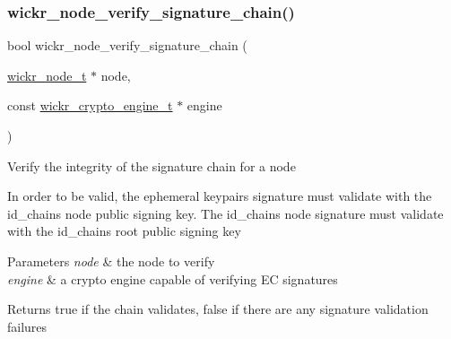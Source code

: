\subsubsection{\texorpdfstring{wickr\+\_\+node\+\_\+verify\+\_\+signature\+\_\+chain()}{wickr\_node\_verify\_signature\_chain()}}
{\footnotesize\ttfamily bool wickr\+\_\+node\+\_\+verify\+\_\+signature\+\_\+chain (\begin{DoxyParamCaption}\item[{\hyperlink{structwickr__node}{wickr\+\_\+node\+\_\+t} $\ast$}]{node,  }\item[{const \hyperlink{structwickr__crypto__engine}{wickr\+\_\+crypto\+\_\+engine\+\_\+t} $\ast$}]{engine }\end{DoxyParamCaption})}

Verify the integrity of the signature chain for a node

In order to be valid, the ephemeral keypair\textquotesingle{}s signature must validate with the id\+\_\+chain\textquotesingle{}s \textquotesingle{}node\textquotesingle{} public signing key. The id\+\_\+chain\textquotesingle{}s \textquotesingle{}node\textquotesingle{} signature must validate with the id\+\_\+chain\textquotesingle{}s \textquotesingle{}root\textquotesingle{} public signing key


\begin{DoxyParams}{Parameters}
{\em node} & the node to verify \\
\hline
{\em engine} & a crypto engine capable of verifying EC signatures \\
\hline
\end{DoxyParams}
\begin{DoxyReturn}{Returns}
true if the chain validates, false if there are any signature validation failures 
\end{DoxyReturn}
